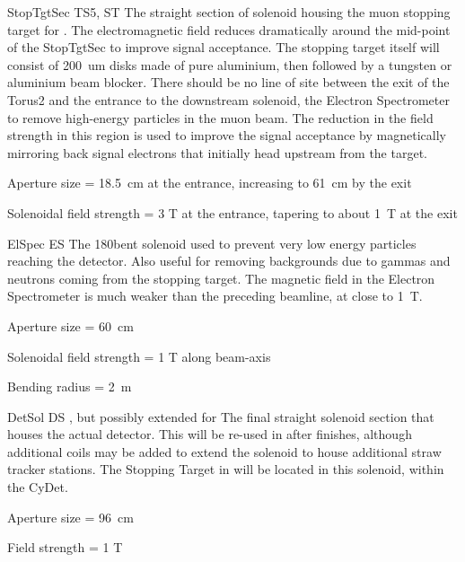 {StopTgtSec}
{TS5, ST}
{\phaseII}
{The straight section of solenoid housing the muon stopping target for \phaseII.  The
electromagnetic field reduces dramatically around the mid-point of the
StopTgtSec to improve signal acceptance.  The stopping target itself will
consist of 200~um disks made of pure aluminium, then followed by a
tungsten or aluminium beam blocker.  There should be no line of site between
the exit of the Torus2 and the entrance to the downstream solenoid, the
Electron Spectrometer to remove high-energy particles in the muon beam.
The reduction in the field strength in this region is used to improve the
signal acceptance by magnetically mirroring back signal electrons that initially head
upstream from the target.
}
{\item Aperture size = 18.5~cm at the entrance, increasing to  61~cm by the exit
 \item Solenoidal field strength = 3 T at the entrance, tapering to about 1~T at the exit}

{ElSpec}
{ES}
{\phaseII}
{The 180\degree bent solenoid used to prevent very low energy particles reaching the detector.
  Also useful for removing backgrounds due to gammas and neutrons coming from the stopping target.
  The magnetic field in the Electron Spectrometer is much weaker than the preceding beamline, at close to 1~T.}
{\item Aperture size = 60~cm
 \item Solenoidal field strength = 1 T along beam-axis
 \item Bending radius = 2~m}

{DetSol}
{DS}
{\phaseI, but possibly extended for \phaseII}
{The final straight solenoid section that houses the actual detector.
  This will be re-used in \phaseII after \phaseI finishes, although additional coils may be added to extend the solenoid to house additional straw tracker stations.
The Stopping Target in \phaseI will be located in this solenoid, within the CyDet.
  }
{\item Aperture size = 96~cm
 \item Field strength = 1 T}

